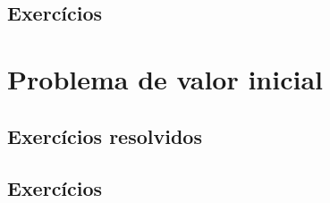 \subsection{Exercícios}
\badgeConstrucao

\section{Problema de valor inicial}\label{cap_apint_sec_pvi}
\badgeConstrucao

\subsection{Exercícios resolvidos}
\badgeConstrucao

\subsection{Exercícios}
\badgeConstrucao
